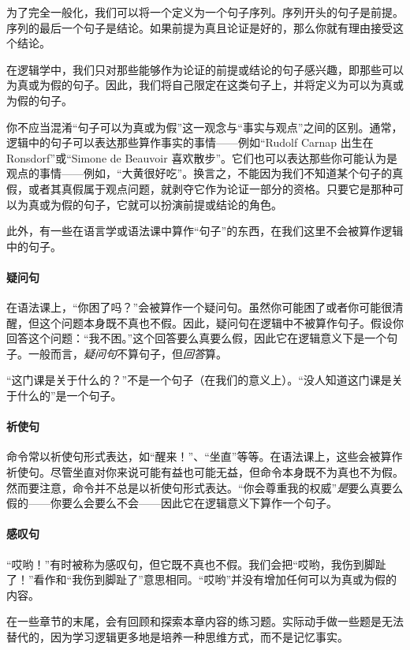 为了完全一般化，我们可以将一个定义为一个句子序列。序列开头的句子是前提。序列的最后一个句子是结论。如果前提为真且论证是好的，那么你就有理由接受这个结论。

在逻辑学中，我们只对那些能够作为论证的前提或结论的句子感兴趣，即那些可以为真或为假的句子。因此，我们将自己限定在这类句子上，并将定义为可以为真或为假的句子。

你不应当混淆“句子可以为真或为假”这一观念与“事实与观点”之间的区别。通常，逻辑中的句子可以表达那些算作事实的事情——例如“Rudolf Carnap 出生在 Ronsdorf”或“Simone de Beauvoir 喜欢散步”。它们也可以表达那些你可能认为是观点的事情——例如，“大黄很好吃”。换言之，不能因为我们不知道某个句子的真假，或者其真假属于观点问题，就剥夺它作为论证一部分的资格。只要它是那种可以为真或为假的句子，它就可以扮演前提或结论的角色。

此外，有一些在语言学或语法课中算作“句子”的东西，在我们这里不会被算作逻辑中的句子。

\paragraph{疑问句} 在语法课上，“你困了吗？”会被算作一个疑问句。虽然你可能困了或者你可能很清醒，但这个问题本身既不真也不假。因此，疑问句在逻辑中不被算作句子。假设你回答这个问题：“我不困。”这个回答要么真要么假，因此它在逻辑意义下是一个句子。一般而言，\emph{疑问句}不算句子，但\emph{回答}算。

“这门课是关于什么的？”不是一个句子（在我们的意义上）。“没人知道这门课是关于什么的”是一个句子。

\paragraph{祈使句} 命令常以祈使句形式表达，如“醒来！”、“坐直”等等。在语法课上，这些会被算作祈使句。尽管坐直对你来说可能有益也可能无益，但命令本身既不为真也不为假。然而要注意，命令并不总是以祈使句形式表达。“你会尊重我的权威”\emph{是}要么真要么假的——你要么会要么不会——因此它在逻辑意义下算作一个句子。

\paragraph{感叹句}“哎哟！”有时被称为感叹句，但它既不真也不假。我们会把“哎哟，我伤到脚趾了！”看作和“我伤到脚趾了”意思相同。“哎哟”并没有增加任何可以为真或为假的内容。

\practiceproblems
在一些章节的末尾，会有回顾和探索本章内容的练习题。实际动手做一些题是无法替代的，因为学习逻辑更多地是培养一种思维方式，而不是记忆事实。

